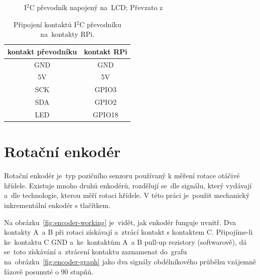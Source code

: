 \begin{figure}[htb]
\begin{minipage}{0.45\textwidth}
    \caption{\label{fig:LCD_back} I$^{2}$C převodník napojený na~LCD; Převzato z~\cite{laskakit-LCD}}
  \end{minipage}
\end{figure}

\begin{table}[htb]
  \centering
  \begin{tabular}{c|c}
    kontakt převodníku & kontakt RPi \\
    \hline
    GND                & GND         \\
    5V                 & 5V          \\
    SCK                & GPIO3       \\
    SDA                & GPIO2       \\
    LED                & GPIO18      \\
  \end{tabular}
  \caption{\label{tab:LCD_conn} Připojení kontaktů I$^{2}$C převodníku na~kontakty RPi.}
\end{table}


\section{Rotační enkodér~\cite{how-encoders-work}\cite{rotary-encoder-cvut}}
Rotační enkodér je~typ pozičního senzoru používaný k měření rotace otáčivé hřídele. Existuje mnoho druhů enkodérů, rozdělují se~dle signálu, který vydávají a~dle technologie, kterou měří rotaci hřídele. V této práci je~použit mechanický inkrementální enkodér s tlačítkem.

Na obrázku~\ref{fig:encoder-working} je~vidět, jak enkodér funguje uvnitř. Dva kontakty A~a B při rotaci získávají a~ztrácí kontakt s kontaktem C. Připojíme-li ke~kontaktu C GND a~ke~kontaktům A~a B pull-up rezistory (softwarově), dá se~toto získávání a~ztrácení kontaktu zaznamenat do~grafu na~obrázku~\ref{fig:encoder-graph} jako dva signály obdélníkového průběhu vzájemně fázově posunuté o 90 stupňů.

